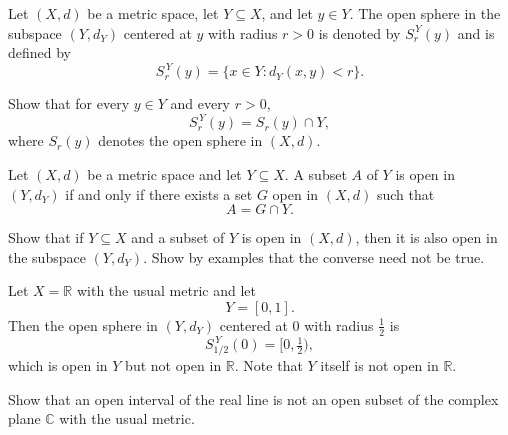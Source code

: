 \documentclass[12pt, a4paper]{article}
\begin{document}
\clearpage

\begin{definition}
Let $(X,d)$ be a metric space, let $Y\subseteq X$, and let $y\in Y$.
The open sphere in the subspace $(Y,d_Y)$ centered at $y$ with radius $r>0$ is denoted by
$S_r^{\,Y}(y)$ and is defined by
\[
S_r^{\,Y}(y)=\{x\in Y : d_Y(x,y)<r\}.
\]
\end{definition}

\vspace{100pt}

\begin{problem}
Show that for every $y\in Y$ and every $r>0$,
\[
S_r^{\,Y}(y)=S_r(y)\cap Y,
\]
where $S_r(y)$ denotes the open sphere in $(X,d)$.
\end{problem}


\clearpage

\begin{theorem}
Let $(X,d)$ be a metric space and let $Y\subseteq X$. A subset $A$ of $Y$ is open in
$(Y,d_Y)$ if and only if there exists a set $G$ open in $(X,d)$ such that
\[
A = G \cap Y.
\]
\end{theorem}

\clearpage

\begin{theorem}
Show that if $Y\subseteq X$ and a subset of $Y$ is open in $(X,d)$, then it is also open in
the subspace $(Y,d_Y)$. Show by examples that the converse need not be true.
\end{theorem}

\vspace{20pt}

\begin{problem}
Let $X=\mathbb{R}$ with the usual metric and let
\[
Y=[0,1].
\]
Then the open sphere in $(Y,d_Y)$ centered at $0$ with radius $\tfrac12$ is
\[
S^{\,Y}_{1/2}(0)=[0,\tfrac12),
\]
which is open in $Y$ but not open in $\mathbb{R}$. Note that $Y$ itself is not open in
$\mathbb{R}$.
\end{problem}

\vspace{80pt}

\begin{problem}
Show that an open interval of the real line is not an open subset of the complex plane
$\mathbb{C}$ with the usual metric.
\end{problem}

\clearpage

\EndPage
\end{document}
